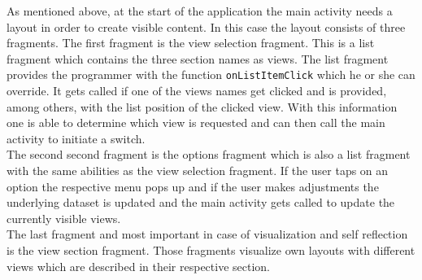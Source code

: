 As  mentioned above, at the start of the application the main activity needs a layout in order to create visible content. In this case the layout consists of three fragments. The first fragment is the view selection fragment. This is a list fragment which contains the three section names as views. The list fragment provides the programmer with the function \lstinline[language=Java]$onListItemClick$ which he or she can override. It gets called if one of the views names get clicked and is provided, among others, with the list position of the clicked view. With this information one is able to determine which view is requested and can then call the main activity to initiate a switch.\\
The second second fragment is the options fragment which is also a list fragment with the same abilities as the view selection fragment. If the user taps on an option the respective menu pops up and if the user makes adjustments the underlying dataset is updated and the main activity gets called to update the currently visible views.\\
The last fragment and most important in case of visualization and self reflection is the view section fragment. Those fragments visualize own layouts with different views which are described in their respective section.

